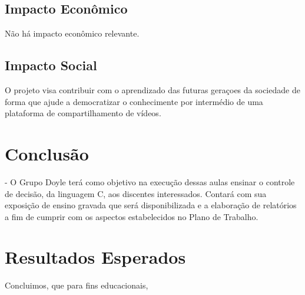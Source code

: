 \documentclass[a4paper,10pt]{article}  %
\begin{document}
 \subsection{Impacto Econômico}

  Não há impacto econômico relevante.

 \subsection{Impacto Social}

   O projeto visa contribuir com o aprendizado das futuras geraçoes da sociedade de forma que ajude a democratizar o conhecimente por intermédio de uma plataforma de compartilhamento de vídeos.



\section{Conclusão}

   -  O Grupo Doyle terá como objetivo na execução dessas aulas ensinar o controle de decisão, da linguagem C, aos discentes interessados.
 Contará com sua exposição de ensino gravada que será disponibilizada e a elaboração de relatórios a fim de cumprir com os aspectos estabelecidos no Plano de Trabalho.





\section{Resultados Esperados}



   Concluimos, que para fins educacionais,  %
\end{document}
